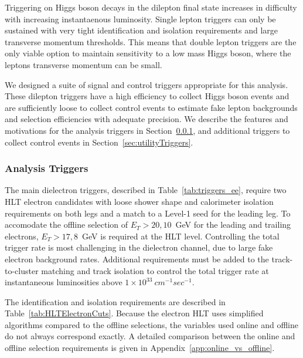 Triggering on Higgs boson decays in the dilepton final state increases 
in difficulty with increasing instantaenous luminosity.
Single lepton triggers can only be sustained with very tight identification and
isolation requirements and large transverse momentum thresholds.
This means that double lepton triggers are the only viable option to maintain
sensitivity to a low mass Higgs boson, where the leptons transverse momentum
can be small.

We designed a suite of signal and control triggers appropriate for this analysis.
These dilepton triggers have a high efficiency to collect Higgs boson events
and are sufficiently loose to collect control events to estimate
fake lepton backgrounds and selection efficiencies with adequate precision.
We describe the features and motivations for the analysis triggers in Section~\ref{sec:mainTriggers},
and additional triggers to collect control events in 
Section~\ref{sec:utilityTriggers}.

\subsubsection{Analysis Triggers}
\label{sec:mainTriggers}

The main dielectron triggers, described in Table~\ref{tab:triggers_ee}, require two HLT electron
candidates with loose shower shape and calorimeter isolation requirements on both legs
and a match to a Level-1 seed for the leading leg.
To accomodate the offline selection of $E_{T}>20,10$~GeV for the leading and trailing
electrons, $E_{T}>17,8$~GeV is required at the HLT level.
Controlling the total trigger rate is most challenging in
the dielectron channel, due to large fake electron background rates.
Additional requirements must be added to the track-to-cluster matching
and track isolation to control the total trigger rate at 
instantaneous luminosities above $1\times10^{33}~cm^{-1}sec^{-1}$.

The identification and isolation requirements are described in Table~\ref{tab:HLTElectronCuts}.
Because the electron HLT uses simplified algorithms compared to the offline selections,
the variables used online and offline do not always correspond exactly.
A detailed comparison between the online and offline selection requirements is given in
Appendix~\ref{app:online_vs_offline}.

